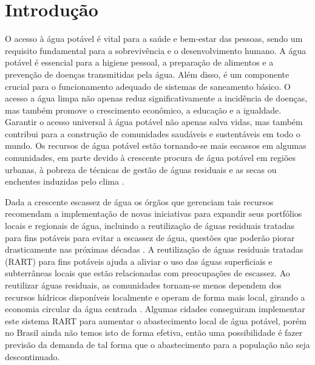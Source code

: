 


\section{Introdu{\c c}{\~a}o} \label{sec:int}


O acesso à água potável é vital para a saúde e bem-estar das pessoas, sendo um requisito fundamental para a sobrevivência e o desenvolvimento humano. A água potável é essencial para a higiene pessoal, a preparação de alimentos e a prevenção de doenças transmitidas pela água. Além disso, é um componente crucial para o funcionamento adequado de sistemas de saneamento básico. O acesso a água limpa não apenas reduz significativamente a incidência de doenças, mas também promove o crescimento econômico, a educação e a igualdade. Garantir o acesso universal à água potável não apenas salva vidas, mas também contribui para a construção de comunidades saudáveis e sustentáveis em todo o mundo. Os recursos de água potável estão tornando-se mais escassos em algumas comunidades, em parte devido à crescente procura de água potável em regiões urbanas, à pobreza de técnicas de gestão de águas residuais e as secas ou enchentes induzidas pelo clima
\cite{10.2166/wp.2022.071}.

Dada a crescente escassez de água os órgãos que gerenciam tais recursos recomendam a implementação de novas iniciativas para expandir seus portfólios locais e regionais de água, incluindo a reutilização de águas residuais tratadas para fins potáveis para evitar a escassez de água, questões que poderão piorar drasticamente nas próximas décadas \cite{BARNES2023139587}. A reutilização de águas residuais tratadas (RART) para fins potáveis ajuda a aliviar o uso das águas superficiais e subterrâneas locais que estão relacionadas com preocupações de escassez. Ao reutilizar águas residuais, as comunidades tornam-se menos dependem dos recursos hídricos disponíveis localmente e operam de forma mais local, girando a economia circular da água centrada \cite{TSATSOU2023136325}. Algumas cidades conseguiram implementar este sistema RART para aumentar o abastecimento local de água potável, porém no Brasil ainda não temos isto de forma efetiva, então uma possibilidade é fazer previsão da demanda de tal forma que o abastecimento para a população não seja descontinuado. 

